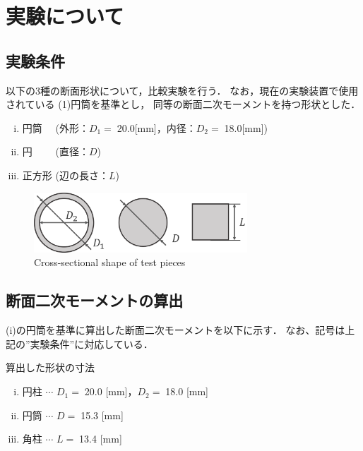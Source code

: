 \documentclass[twocolumn,a4j]{jsarticle}
\begin{document}
\section{実験について}
\subsection{実験条件}
以下の3種の断面形状について，比較実験を行う．
なお，現在の実験装置で使用されている (1)円筒を基準とし，
同等の断面二次モーメントを持つ形状とした．
\begin{enumerate}[(i)]
    \item 円筒 　(外形：$D_1=\;$20.0[mm]，内径：$D_2=\;$18.0[mm])
    \item 円　 　(直径：$D$)
    \item 正方形 (辺の長さ：$L$)
\end{enumerate}
\begin{figure}[htbp]
    \footnotesize
    \begin{center}
        \includegraphics[width=80mm]{../images/testpieces_2.png}
        \caption{Cross-sectional shape of test pieces}
    \end{center}
\end{figure}
\newpage
\subsection{断面二次モーメントの算出}
(i)の円筒を基準に算出した断面二次モーメントを以下に示す．
なお、記号は上記の”実験条件”に対応している．
\begin{itembox}[l]{算出した形状の寸法}
    \begin{enumerate}[(i)]
        \item 円柱 $\cdots$ $D_1=\;$20.0 [mm]，$D_2=\;$18.0 [mm]
        \item 円筒 $\cdots$ $D=\;$15.3 [mm]
        \item 角柱 $\cdots$ $L=\;$13.4 [mm]
    \end{enumerate}
\end{itembox}
\end{document}
